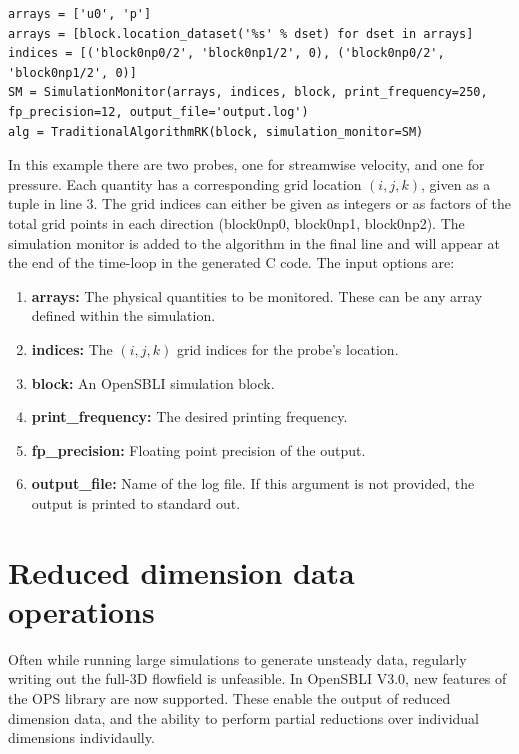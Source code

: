 \documentclass[11pt]{article}
\begin{document}
\begin{lstlisting}
arrays = ['u0', 'p']
arrays = [block.location_dataset('%s' % dset) for dset in arrays]
indices = [('block0np0/2', 'block0np1/2', 0), ('block0np0/2', 'block0np1/2', 0)]
SM = SimulationMonitor(arrays, indices, block, print_frequency=250, fp_precision=12, output_file='output.log')
alg = TraditionalAlgorithmRK(block, simulation_monitor=SM)
\end{lstlisting}

In this example there are two probes, one for streamwise velocity, and one for pressure. Each quantity has a corresponding grid location $\left(i, j, k\right)$, given as a tuple in line 3. The grid indices can either be given as integers or as factors of the total grid points in each direction (block0np0, block0np1, block0np2). The simulation monitor is added to the algorithm in the final line and will appear at the end of the time-loop in the generated C code. The input options are:

\begin{enumerate}
\item{\textbf{arrays:} The physical quantities to be monitored. These can be any array defined within the simulation.}
\item{\textbf{indices:} The $\left(i, j, k\right)$ grid indices for the probe's location.}
\item{\textbf{block:} An OpenSBLI simulation block.}
\item{\textbf{print\_frequency:} The desired printing frequency.}
\item{\textbf{fp\_precision:} Floating point precision of the output.}
\item{\textbf{output\_file:} Name of the log file. If this argument is not provided, the output is printed to standard out.}
\end{enumerate}

\newpage
\section{Reduced dimension data operations}
Often while running large simulations to generate unsteady data, regularly writing out the full-3D flowfield is unfeasible. In OpenSBLI V3.0, new features of the OPS library are now supported. These enable the output of reduced dimension data, and the ability to perform partial reductions over individual dimensions individaully.
\end{document}
